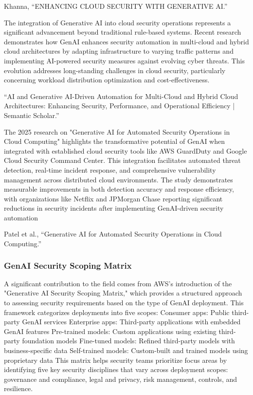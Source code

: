 Khanna, “ENHANCING CLOUD SECURITY WITH GENERATIVE AI.”

The integration of Generative AI into cloud security operations represents a significant advancement beyond traditional rule-based systems. Recent research demonstrates how GenAI enhances security automation in multi-cloud and hybrid cloud architectures by adapting infrastructure to varying traffic patterns and implementing AI-powered security measures against evolving cyber threats. This evolution addresses long-standing challenges in cloud security, particularly concerning workload distribution optimization and cost-effectiveness.

“AI and Generative AI-Driven Automation for Multi-Cloud and Hybrid Cloud Architectures: Enhancing Security, Performance, and Operational Efficiency | Semantic Scholar.”

The 2025 research on "Generative AI for Automated Security Operations in Cloud Computing" highlights the transformative potential of GenAI when integrated with established cloud security tools like AWS GuardDuty and Google Cloud Security Command Center. This integration facilitates automated threat detection, real-time incident response, and comprehensive vulnerability management across distributed cloud environments. The study demonstrates measurable improvements in both detection accuracy and response efficiency, with organizations like Netflix and JPMorgan Chase reporting significant reductions in security incidents after implementing GenAI-driven security automation

Patel et al., “Generative AI for Automated Security Operations in Cloud Computing.”


\subsubsection{GenAI Security Scoping Matrix} %
\label{sec: GenAI Security Scoping Matrix}

A significant contribution to the field comes from AWS's introduction of the "Generative AI Security Scoping Matrix," which provides a structured approach to assessing security requirements based on the type of GenAI deployment. This framework categorizes deployments into five scopes:
Consumer apps: Public third-party GenAI services
Enterprise apps: Third-party applications with embedded GenAI features
Pre-trained models: Custom applications using existing third-party foundation models
Fine-tuned models: Refined third-party models with business-specific data
Self-trained models: Custom-built and trained models using proprietary data
This matrix helps security teams prioritize focus areas by identifying five key security disciplines that vary across deployment scopes: governance and compliance, legal and privacy, risk management, controls, and resilience.

